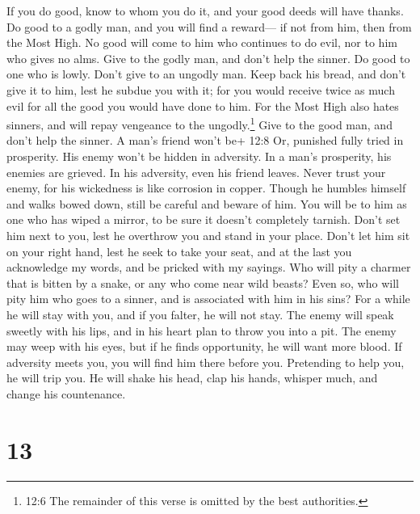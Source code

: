  If you do good, know to whom you do it, and your good deeds
will have thanks.  Do good to a godly man, and you will find
a reward--- if not from him, then from the Most High.  No
good will come to him who continues to do evil, nor to him who gives no
alms.  Give to the godly man, and don't help the sinner.
 Do good to one who is lowly. Don't give to an ungodly man.
Keep back his bread, and don't give it to him, lest he subdue you with
it; for you would receive twice as much evil for all the good you would
have done to him.  For the Most High also hates sinners, and
will repay vengeance to the ungodly.\footnote{12:6 The remainder of this
  verse is omitted by the best authorities.}  Give to the
good man, and don't help the sinner.  A man's friend won't
be+ 12:8 Or, punished fully tried in prosperity. His enemy won't be
hidden in adversity.  In a man's prosperity, his enemies are
grieved. In his adversity, even his friend leaves.  Never
trust your enemy, for his wickedness is like corrosion in copper.
 Though he humbles himself and walks bowed down, still be
careful and beware of him. You will be to him as one who has wiped a
mirror, to be sure it doesn't completely tarnish.  Don't
set him next to you, lest he overthrow you and stand in your place.
Don't let him sit on your right hand, lest he seek to take your seat,
and at the last you acknowledge my words, and be pricked with my
sayings.  Who will pity a charmer that is bitten by a
snake, or any who come near wild beasts?  Even so, who will
pity him who goes to a sinner, and is associated with him in his sins?
 For a while he will stay with you, and if you falter, he
will not stay.  The enemy will speak sweetly with his lips,
and in his heart plan to throw you into a pit. The enemy may weep with
his eyes, but if he finds opportunity, he will want more blood.
 If adversity meets you, you will find him there before
you. Pretending to help you, he will trip you.  He will
shake his head, clap his hands, whisper much, and change his
countenance.

\hypertarget{section-10}{%
\section{13}\label{section-10}}

